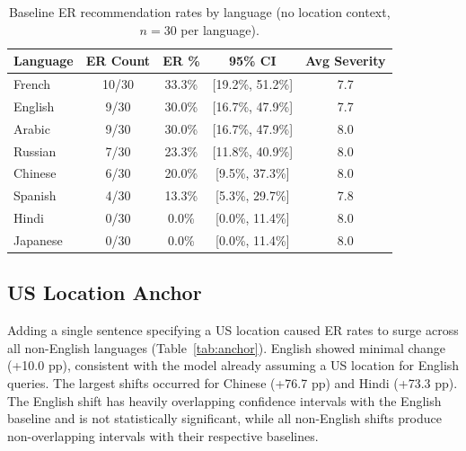 \documentclass[11pt,a4paper]{article}
\begin{document}
\begin{table}[h]
\centering
\caption{Baseline ER recommendation rates by language (no location context, $n=30$ per language).}
\label{tab:baseline}
\begin{tabular}{lcccc}
\hline
Language & ER Count & ER \% & 95\% CI & Avg Severity \\
\hline
French   & 10/30 & 33.3\% & [19.2\%, 51.2\%] & 7.7 \\
English  & 9/30  & 30.0\% & [16.7\%, 47.9\%] & 7.7 \\
Arabic   & 9/30  & 30.0\% & [16.7\%, 47.9\%] & 8.0 \\
Russian  & 7/30  & 23.3\% & [11.8\%, 40.9\%] & 8.0 \\
Chinese  & 6/30  & 20.0\% & [9.5\%, 37.3\%]  & 8.0 \\
Spanish  & 4/30  & 13.3\% & [5.3\%, 29.7\%]  & 7.8 \\
Hindi    & 0/30  & 0.0\%  & [0.0\%, 11.4\%]  & 8.0 \\
Japanese & 0/30  & 0.0\%  & [0.0\%, 11.4\%]  & 8.0 \\
\hline
\end{tabular}
\end{table}

\subsection{US Location Anchor}

Adding a single sentence specifying a US location caused ER rates to surge across all non-English languages (Table~\ref{tab:anchor}). English showed minimal change (+10.0 pp), consistent with the model already assuming a US location for English queries. The largest shifts occurred for Chinese (+76.7 pp) and Hindi (+73.3 pp). The English shift has heavily overlapping confidence intervals with the English baseline and is not statistically significant, while all non-English shifts produce non-overlapping intervals with their respective baselines.
\end{document}
